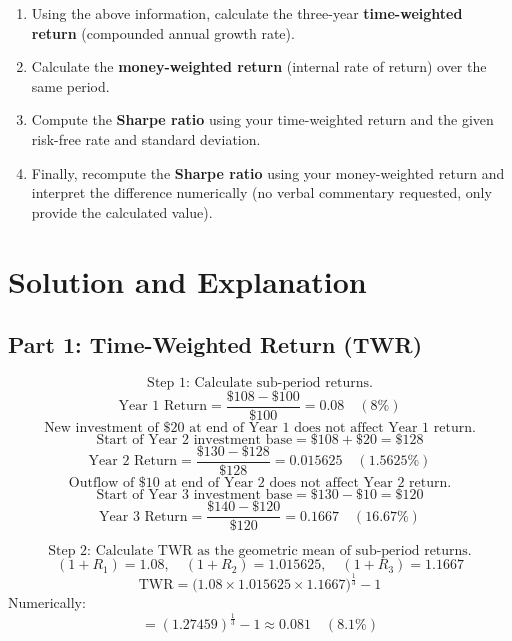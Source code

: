 \begin{enumerate}
\item Using the above information, calculate the three-year \textbf{time-weighted return} (compounded annual growth rate).
\item Calculate the \textbf{money-weighted return} (internal rate of return) over the same period.
\item Compute the \textbf{Sharpe ratio} using your time-weighted return and the given risk-free rate and standard deviation.
\item Finally, recompute the \textbf{Sharpe ratio} using your money-weighted return and interpret the difference numerically (no verbal commentary requested, only provide the calculated value).
\end{enumerate}

\section*{Solution and Explanation}

\subsection*{Part 1: Time-Weighted Return (TWR)}
\[
\text{Step 1: Calculate sub-period returns.}
\]
\[
\text{Year 1 Return} = \frac{\$108 - \$100}{\$100} = 0.08 \quad (8\%)
\]
\[
\text{New investment of \$20 at end of Year 1 does not affect Year 1 return.}
\]
\[
\text{Start of Year 2 investment base} = \$108 + \$20 = \$128
\]
\[
\text{Year 2 Return} = \frac{\$130 - \$128}{\$128} = 0.015625 \quad (1.5625\%)
\]
\[
\text{Outflow of \$10 at end of Year 2 does not affect Year 2 return.}
\]
\[
\text{Start of Year 3 investment base} = \$130 - \$10 = \$120
\]
\[
\text{Year 3 Return} = \frac{\$140 - \$120}{\$120} = 0.1667 \quad (16.67\%)
\]

\[
\text{Step 2: Calculate TWR as the geometric mean of sub-period returns.}
\]
\[
(1 + R_1) = 1.08,\quad (1 + R_2) = 1.015625,\quad (1 + R_3) = 1.1667
\]
\[
\text{TWR} = \Big(1.08 \times 1.015625 \times 1.1667\Big)^{\frac{1}{3}} - 1
\]
Numerically:
\[
= (1.27459)^{\frac{1}{3}} - 1 \approx 0.081 \quad (8.1\%)
\]

